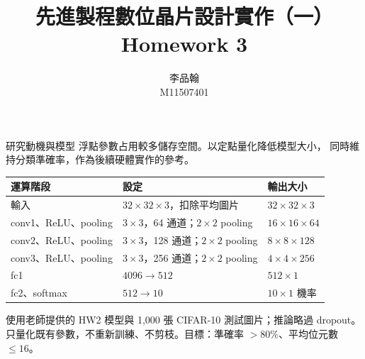 \documentclass[aspectratio=169,11pt]{beamer}
\title{先進製程數位晶片設計實作（一）\\Homework 3}
\author{\texorpdfstring{李品翰\\M11507401}{李品翰 M11507401}}
\date{}
\begin{document}
\begin{frame}
  \titlepage
\end{frame}

\begin{frame}{研究動機與模型}
  \small
  浮點參數占用較多儲存空間。以定點量化降低模型大小，
  同時維持分類準確率，作為後續硬體實作的參考。

  \vspace{0.6em}
  \centering
  \begin{tabular}{lll}
    \toprule
    運算階段 & 設定 & 輸出大小 \\
    \midrule
    輸入 & $32\times32\times3$，扣除平均圖片 & $32\times32\times3$ \\
    conv1、ReLU、pooling & $3\times3$，64 通道；$2\times2$ pooling & $16\times16\times64$ \\
    conv2、ReLU、pooling & $3\times3$，128 通道；$2\times2$ pooling & $8\times8\times128$ \\
    conv3、ReLU、pooling & $3\times3$，256 通道；$2\times2$ pooling & $4\times4\times256$ \\
    fc1 & $4096\rightarrow512$ & $512\times1$ \\
    fc2、softmax & $512\rightarrow10$ & $10\times1$ 機率 \\
    \bottomrule
  \end{tabular}

  \vspace{0.5em}
  \begin{flushleft}
    \footnotesize
    使用老師提供的 HW2 模型與 1,000 張 CIFAR-10 測試圖片；推論略過 dropout。\\
    只量化既有參數，不重新訓練、不剪枝。目標：準確率 $>80\%$、平均位元數 $\leq16$。
  \end{flushleft}
\end{frame}
\end{document}
